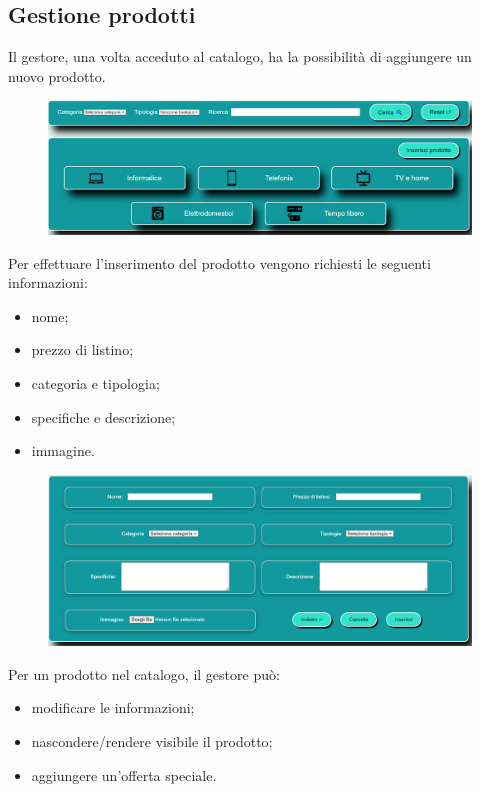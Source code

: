 \documentclass[a4paper, 14pt]{article}
\begin{document}
\begin{flushleft}
			\subsection{Gestione prodotti}
				Il gestore, una volta acceduto al catalogo, ha la possibilità di aggiungere un nuovo prodotto.
				\begin{figure}[H]
					\centering
					\includegraphics[width=\textwidth, frame=2pt]{"screenInserimentoCatalogo.png"}	
				\end{figure}
				Per effettuare l'inserimento del prodotto vengono richiesti le seguenti informazioni:
					\begin{itemize}
						\item nome;
						\item prezzo di listino;
						\item categoria e tipologia;
						\item specifiche e descrizione;
						\item immagine.
					\end{itemize}
				\begin{figure}[H]
					\centering
					\includegraphics[width=\textwidth, frame=2pt]{"screenInserimentoProdotto.png"}	
				\end{figure}
				Per un prodotto nel catalogo, il gestore può:
					\begin{itemize}
						\item modificare le informazioni;
						\item nascondere/rendere visibile il prodotto;
						\item aggiungere un'offerta speciale.

\end{itemize}
\end{flushleft}
\end{document}
